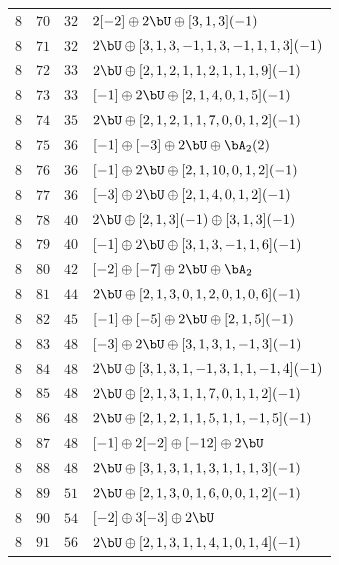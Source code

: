\begin{center}
\begin{longtable}{llll}
 \(8\) & \(70\) & \(32\) & \(2 [-2] \oplus 2 \bU \oplus [3, 1, 3](-1)\) \\
 \(8\) & \(71\) & \(32\) & \(2 \bU \oplus [3, 1, 3, -1, 1, 3, -1, 1, 1, 3](-1)\) \\
 \(8\) & \(72\) & \(33\) & \(2 \bU \oplus [2, 1, 2, 1, 1, 2, 1, 1, 1, 9](-1)\) \\
 \(8\) & \(73\) & \(33\) & \([-1] \oplus 2 \bU \oplus [2, 1, 4, 0, 1, 5](-1)\) \\
 \(8\) & \(74\) & \(35\) & \(2 \bU \oplus [2, 1, 2, 1, 1, 7, 0, 0, 1, 2](-1)\) \\
 \(8\) & \(75\) & \(36\) & \([-1] \oplus [-3] \oplus 2 \bU \oplus \bA_{2}(2)\) \\
 \(8\) & \(76\) & \(36\) & \([-1] \oplus 2 \bU \oplus [2, 1, 10, 0, 1, 2](-1)\) \\
 \(8\) & \(77\) & \(36\) & \([-3] \oplus 2 \bU \oplus [2, 1, 4, 0, 1, 2](-1)\) \\
 \(8\) & \(78\) & \(40\) & \(2 \bU \oplus [2, 1, 3](-1) \oplus [3, 1, 3](-1)\) \\
 \(8\) & \(79\) & \(40\) & \([-1] \oplus 2 \bU \oplus [3, 1, 3, -1, 1, 6](-1)\) \\
 \(8\) & \(80\) & \(42\) & \([-2] \oplus [-7] \oplus 2 \bU \oplus \bA_{2}\) \\
 \(8\) & \(81\) & \(44\) & \(2 \bU \oplus [2, 1, 3, 0, 1, 2, 0, 1, 0, 6](-1)\) \\
 \(8\) & \(82\) & \(45\) & \([-1] \oplus [-5] \oplus 2 \bU \oplus [2, 1, 5](-1)\) \\
 \(8\) & \(83\) & \(48\) & \([-3] \oplus 2 \bU \oplus [3, 1, 3, 1, -1, 3](-1)\) \\
 \(8\) & \(84\) & \(48\) & \(2 \bU \oplus [3, 1, 3, 1, -1, 3, 1, 1, -1, 4](-1)\) \\
 \(8\) & \(85\) & \(48\) & \(2 \bU \oplus [2, 1, 3, 1, 1, 7, 0, 1, 1, 2](-1)\) \\
 \(8\) & \(86\) & \(48\) & \(2 \bU \oplus [2, 1, 2, 1, 1, 5, 1, 1, -1, 5](-1)\) \\
 \(8\) & \(87\) & \(48\) & \([-1] \oplus 2 [-2] \oplus [-12] \oplus 2 \bU\) \\
 \(8\) & \(88\) & \(48\) & \(2 \bU \oplus [3, 1, 3, 1, 1, 3, 1, 1, 1, 3](-1)\) \\
 \(8\) & \(89\) & \(51\) & \(2 \bU \oplus [2, 1, 3, 0, 1, 6, 0, 0, 1, 2](-1)\) \\
 \(8\) & \(90\) & \(54\) & \([-2] \oplus 3 [-3] \oplus 2 \bU\) \\
 \(8\) & \(91\) & \(56\) & \(2 \bU \oplus [2, 1, 3, 1, 1, 4, 1, 0, 1, 4](-1)\) \\

\end{longtable}
\end{center}
